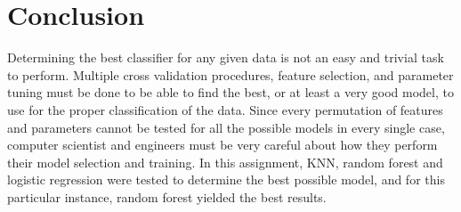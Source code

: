\documentclass{article}
\begin{document}
\section{Conclusion}  
Determining the best classifier for any given data is not an easy and trivial task to perform. Multiple cross validation procedures, feature selection, and parameter tuning must be done to be able to find the best, or at least a very good model, to use for the proper classification of the data. Since every permutation of features and parameters cannot be tested for all the possible models in every single case, computer scientist and engineers must be very careful about how they perform their model selection and training. In this assignment, KNN, random forest and logistic regression were tested to determine the best possible model, and for this particular instance, random forest yielded the best results. 
\end{document}

